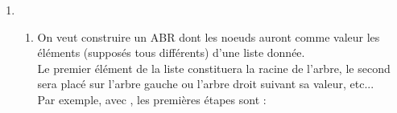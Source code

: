 \documentclass[11pt,a4paper,french,twoside]{PMCours}
\begin{document}
\begin{enumerate}
\begin{enumerate}
\begin{enumerate}
\item La valeur 4 peut-elle être présente dans l'arbre ? Si oui, à quel noeud ?
\item La valeur 7 peut-elle être présente dans l'arbre ? Si oui, à quel noeud ?
\item Plus généralement, en justifiant brièvement, quelles valeurs peuvent avoir les noeuds ,  et  ?
\end{enumerate}
\item En vous aidant des raisonnements développés à la question précédente, compléter le code suivant pour en faire le code d'une fonction s'appelant  prenant comme argument un noeud-racine d'un ABR  et un nombre  et renvoyant  si  est un élément de l'arbre et  sinon. 
\begin{Python}
def #à compléter1
	a=n
	while a is not None :
		if a.valeur == elt :
			return #à compléter2
		elif #à compléter3
			a=a.gauche
		else : 
			#à compléter4
	return False
\end{Python}
\end{enumerate}
\item \begin{enumerate}
\item On veut construire un ABR dont les noeuds auront comme valeur les éléments (supposés tous différents) d'une liste donnée.\\
Le premier élément de la liste constituera la racine de l'arbre, le second sera placé sur l'arbre gauche ou l'arbre droit suivant sa valeur, etc... \\
Par exemple, avec , les premières étapes sont : 
\begin{multicols}{4}
 

\end{multicols}
\end{enumerate}
\end{enumerate}
\end{document}
